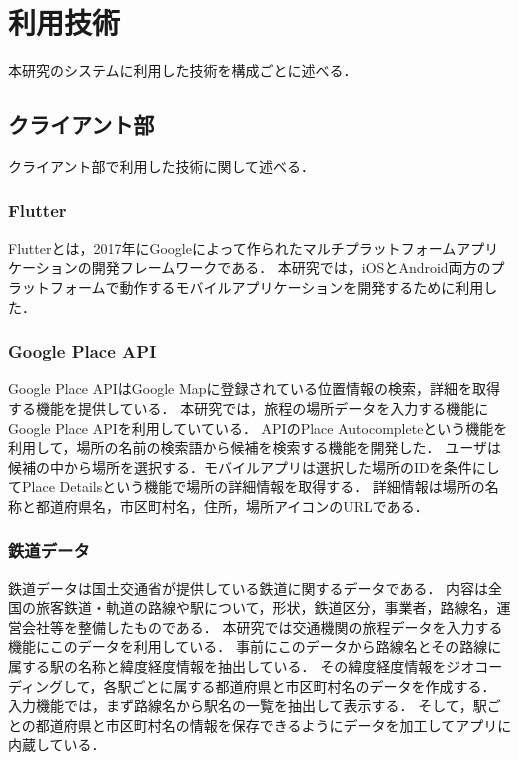 \section{利用技術}

本研究のシステムに利用した技術を構成ごとに述べる．

\subsection{クライアント部}
クライアント部で利用した技術に関して述べる．

\subsubsection{Flutter}
Flutter\cite{Flutter}とは，2017年にGoogleによって作られたマルチプラットフォームアプリケーションの開発フレームワークである．
本研究では，iOSとAndroid両方のプラットフォームで動作するモバイルアプリケーションを開発するために利用した．

\subsubsection{Google Place API}
Google Place API\cite{GoogleMap}はGoogle Mapに登録されている位置情報の検索，詳細を取得する機能を提供している．
本研究では，旅程の場所データを入力する機能にGoogle Place APIを利用していている．
APIのPlace Autocompleteという機能を利用して，場所の名前の検索語から候補を検索する機能を開発した．
ユーザは候補の中から場所を選択する．モバイルアプリは選択した場所のIDを条件にしてPlace Detailsという機能で場所の詳細情報を取得する．
詳細情報は場所の名称と都道府県名，市区町村名，住所，場所アイコンのURLである．

\subsubsection{鉄道データ}
鉄道データ\cite{TrainData}は国土交通省が提供している鉄道に関するデータである．
内容は全国の旅客鉄道・軌道の路線や駅について，形状，鉄道区分，事業者，路線名，運営会社等を整備したものである．
本研究では交通機関の旅程データを入力する機能にこのデータを利用している．
事前にこのデータから路線名とその路線に属する駅の名称と緯度経度情報を抽出している．
その緯度経度情報をジオコーディングして，各駅ごとに属する都道府県と市区町村名のデータを作成する．
入力機能では，まず路線名から駅名の一覧を抽出して表示する．
そして，駅ごとの都道府県と市区町村名の情報を保存できるようにデータを加工してアプリに内蔵している．

